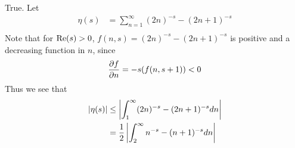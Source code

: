 \documentclass{homework}
\begin{document}
                                                                                                                                                  \begin{solution}
                                                                                                                                                  True. Let
                                                                                                                                                  \begin{align*}
                                                                                                                                                      \eta(s) &= \sum_{n=1}^\infty (2n)^{-s} - (2n + 1)^{-s} \\
                                                                                                                                                      \end{align*}
                                                                                                                                                      Note that for $\operatorname{Re}(s) > 0$, $f(n, s) = (2n)^{-s} - (2n + 1)^{-s}$ is positive and a decreasing function in $n$, since 
                                                                                                                                                      \[
                                                                                                                                                      \frac{\partial f}{\partial n} = -s(f(n, s+1)) < 0
                                                                                                                                                      \]
                                                                                                                                                      Thus we see that
                                                                                                                                                      \begin{align*}
                                                                                                                                                      \abs{\eta(s)}    &\leq \abs{\int_1^\infty (2n)^{-s} - (2n + 1)^{-s} dn}\\
                                                                                                                                                          &= \frac{1}{2}\abs{\int_2^\infty n^{-s} - (n + 1)^{-s} dn}\\

\end{align*}
\end{solution}
\end{document}
